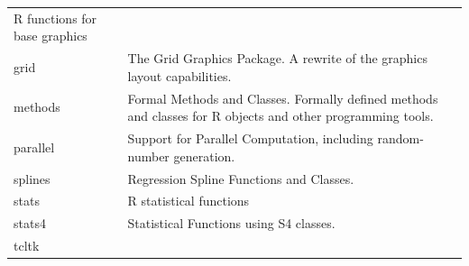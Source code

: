 \documentclass[]{book}
\theoremstyle{definition}
\theoremstyle{definition}
\theoremstyle{definition}
\theoremstyle{remark}
\begin{document}
\begin{longtable}[]{@{}ll@{}}
\begin{minipage}[t]{0.81\columnwidth}
R functions for base graphics\strut
\end{minipage}\tabularnewline
\begin{minipage}[t]{0.13\columnwidth}\raggedright\strut
grid\strut
\end{minipage} & \begin{minipage}[t]{0.81\columnwidth}\raggedright\strut
The Grid Graphics Package. A rewrite of the graphics layout
capabilities.\strut
\end{minipage}\tabularnewline
\begin{minipage}[t]{0.13\columnwidth}\raggedright\strut
methods\strut
\end{minipage} & \begin{minipage}[t]{0.81\columnwidth}\raggedright\strut
Formal Methods and Classes. Formally defined methods and classes for R
objects and other programming tools.\strut
\end{minipage}\tabularnewline
\begin{minipage}[t]{0.13\columnwidth}\raggedright\strut
parallel\strut
\end{minipage} & \begin{minipage}[t]{0.81\columnwidth}\raggedright\strut
Support for Parallel Computation, including random-number
generation.\strut
\end{minipage}\tabularnewline
\begin{minipage}[t]{0.13\columnwidth}\raggedright\strut
splines\strut
\end{minipage} & \begin{minipage}[t]{0.81\columnwidth}\raggedright\strut
Regression Spline Functions and Classes.\strut
\end{minipage}\tabularnewline
\begin{minipage}[t]{0.13\columnwidth}\raggedright\strut
stats\strut
\end{minipage} & \begin{minipage}[t]{0.81\columnwidth}\raggedright\strut
R statistical functions\strut
\end{minipage}\tabularnewline
\begin{minipage}[t]{0.13\columnwidth}\raggedright\strut
stats4\strut
\end{minipage} & \begin{minipage}[t]{0.81\columnwidth}\raggedright\strut
Statistical Functions using S4 classes.\strut
\end{minipage}\tabularnewline
\begin{minipage}[t]{0.13\columnwidth}\raggedright\strut
tcltk\strut

\end{minipage}
\end{longtable}
\end{document}
